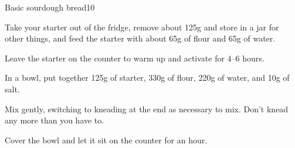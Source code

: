 \documentclass{article}
\begin{document}
  \begin{recipe}{Basic sourdough bread}{10}
    \begin{step}
      \begin{ingrs}
      \end{ingrs}
      \begin{stepdesc}
        Take your starter out of the fridge, remove about 125g and store in a jar for other things, and feed the starter with about 65g of flour and 65g of water.
      \end{stepdesc}
    \end{step}
    \begin{step}
      \begin{ingrs}
      \end{ingrs}
      \begin{stepdesc}
        Leave the starter on the counter to warm up and activate for 4--6 hours.
      \end{stepdesc}
    \end{step}
    \begin{step}
      \begin{ingrs}
      \end{ingrs}
      \begin{stepdesc}
        In a bowl, put together 125g of starter, 330g of flour, 220g of water, and 10g of salt.
      \end{stepdesc}
    \end{step}
    \begin{step}
      \begin{ingrs}
      \end{ingrs}
      \begin{stepdesc}
        Mix gently, switching to kneading at the end as necessary to mix. Don't knead any more than you have to.
      \end{stepdesc}
    \end{step}
    \begin{step}
      \begin{ingrs}
      \end{ingrs}
      \begin{stepdesc}
        Cover the bowl and let it sit on the counter for an hour.
      \end{stepdesc}
    \end{step}

\end{recipe}
\end{document}
